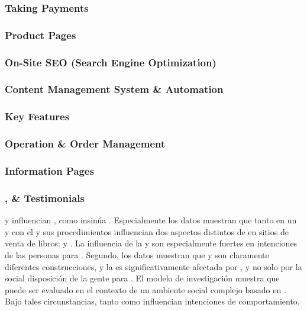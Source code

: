 \subsubsection{Taking Payments}

\subsubsection{Product Pages}

\subsubsection{On-Site SEO (Search Engine Optimization)}

\subsubsection{Content Management System \& Automation}

\subsubsection{Key \ecommerce Features}

\subsubsection{Operation \& Order Management}

\subsubsection{Information Pages}


\subsubsection{\security, \trust \& Testimonials}

\trust y \familiarity influencian \ecommerce, como insinúa \luhmanntheory. Especialmente los datos muestran que tanto \trust en un \consumer \internet y \familiarity con el \seller y sus procedimientos influencian dos aspectos distintos de \ecommerce en sitios de venta de libros: \inquiry y \purchase. La influencia de la  \familiarity y \trust son especialmente fuertes en intenciones  de las personas para \purchase. Segundo, los datos muestran que \trust y \familiarity son claramente diferentes construcciones, y la \trust es significativamente afectada por \familiarity, y no solo por la social disposición de la gente para \trust. El modelo de investigación muestra que  \ecommerce puede ser evaluado en el contexto de un ambiente social complejo basado en \luhmanntheory. Bajo tales circunstancias, tanto \trust como \familiarity influencian intenciones de comportamiento\cite{gefen2000commerce}.

